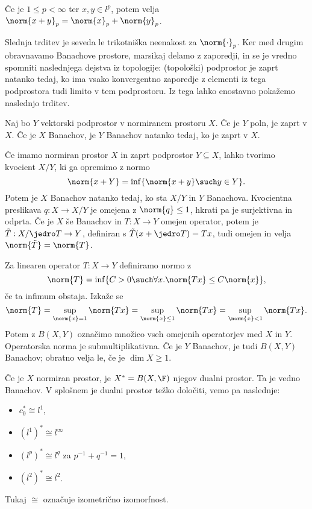 \begin{trditev}[Minkowski]
  Če je $1 \le p < \infty$ ter $x, y \in l^p$, potem velja $\norm{x+y}_p =
  \norm{x}_p + \norm{y}_p$.
\end{trditev}

Slednja trditev je seveda le trikotniška neenakost za $\norm{\cdot}_p$.
Ker med drugim obravnavamo Banachove prostore, marsikaj delamo z zaporedji, in
se je vredno spomniti naslednjega dejstva iz topologije: (topološki) podprostor
je zaprt natanko tedaj, ko ima vsako konvergentno zaporedje z elementi iz tega
podprostora tudi limito v tem podprostoru.
Iz tega lahko enostavno pokažemo naslednjo trditev.

\begin{trditev}
  Naj bo $Y$ vektorski podprostor v normiranem prostoru $X$.
  Če je $Y$ poln, je zaprt v $X$.
  Če je $X$ Banachov, je $Y$ Banachov natanko tedaj, ko je zaprt v $X$.
\end{trditev}

Če imamo normiran prostor $X$ in zaprt podprostor $Y \subseteq X$, lahko tvorimo
kvocient $X/Y$, ki ga opremimo z normo
\[
  \norm{x + Y} = \inf \{ \norm{x + y} \such y \in Y \}.
\]
Potem je $X$ Banachov natanko tedaj, ko sta $X/Y$ in $Y$ Banachova.
Kvocientna preslikava $q: X \to X/Y$ je omejena z $\norm{q} \le 1$, hkrati pa je
surjektivna in odprta.
Če je $X$ še Banachov in $T: X \to Y$ omejen operator, potem je $\tilde{T}:
X/\jedro T \to Y$, definiran s $\tilde{T}(x + \jedro T) = Tx$, tudi omejen in
velja $\norm{\tilde{T}} = \norm{T}$.

Za linearen operator $T: X \to Y$ definiramo normo z
\[
  \norm{T} = \inf \{ C > 0 \such \forall x. \norm{Tx} \le C \norm{x} \},
\]
če ta infimum obstaja.
Izkaže se
\[
  \norm{T} = \sup_{\norm{x} = 1} \norm{Tx} = \sup_{\norm{x} \le 1} \norm{Tx}
  = \sup_{\norm{x} < 1} \norm{Tx}.
\]
Potem z $B(X,Y)$ označimo množico vseh omejenih operatorjev med $X$ in $Y$.
Operatorska norma je submultiplikativna.
Če je $Y$ Banachov, je tudi $B(X,Y)$ Banachov; obratno velja le, če je $\dim X
\ge 1$.


Če je $X$ normiran prostor, je $X^* = B(X, \F)$ njegov dualni prostor.
Ta je vedno Banachov.
V splošnem je dualni prostor težko določiti, vemo pa naslednje:
\begin{itemize}
\item $c_0^* \cong l^1$,
\item $(l^1)^* \cong l^\infty$
\item $(l^p)^* \cong l^q$ za $p^{-1} + q^{-1} =1$,
\item $(l^2)^* \cong l^2$.
\end{itemize}
Tukaj $\cong$ označuje izometrično izomorfnost.

